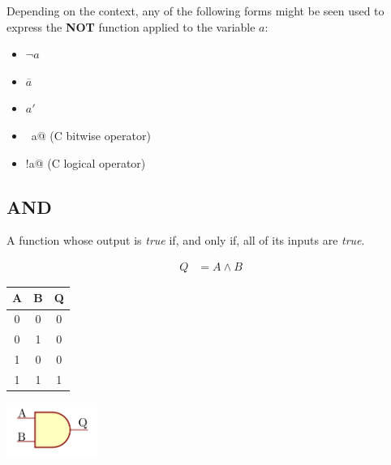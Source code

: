 \documentclass[10pt]{article}
\begin{document}
Depending on the context, any of the following forms might be seen used to 
express the {\bfseries NOT} function applied to the variable $a$:

\begin{itemize}
\item $\neg a$
\item $\overline{a}$
\item $a'$
\item \verb@~a@ (C bitwise operator)
\item \verb@!a@ (C logical operator)
\end{itemize}



\subsection{AND}

A function whose output is {\em true} if, and only if, all of its inputs are {\em true}.

\begin{align}
Q &= A \land B
\end{align}

\begin{center}
\begin{tabular}{|cc|c|}
\hline
A & B & Q \\
\hline
0 & 0 & 0 \\
0 & 1 & 0 \\
1 & 0 & 0 \\
1 & 1 & 1 \\
\hline
\end{tabular}

\includegraphics[width=3cm]{and.png}
\end{center}

%
\end{document}
